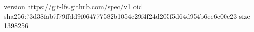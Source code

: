 version https://git-lfs.github.com/spec/v1
oid sha256:73d38fab7f79ffdd9f064777582b1054c29f4f24d205f5d64d954b6ee6c00c23
size 1398256
